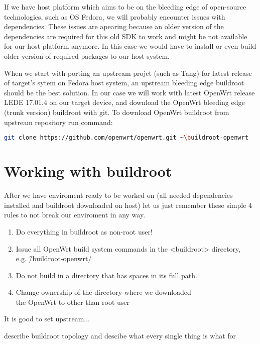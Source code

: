 If we have host platform which aims to be on the bleeding edge of open-source technologies, such as OS Fedora, we will probably encounter issues with dependencies.
These issues are apearing because an older version of the dependencies are required for this old SDK to work and might be not available for our host platform anymore.
In this case we would have to install or even build older version of required packages to our host system.

When we start with porting an upstream projet (such as Tang) for latest release of target's sytem on Fedora host system, an upstream bleeding edge buildroot should be the best solution.
In our case we will work with latest OpenWrt release LEDE 17.01.4 on our target device, and download the OpenWrt bleeding edge (trunk version) buildroot with git.
To download OpenWrt buildroot from upstream repository run command:
\begin{lstlisting}[language=bash,basicstyle=\ttfamily\footnotesize,label=get-trunk,caption=Cloning upstream OpenWrt buildroot]
    git clone https://github.com/openwrt/openwrt.git ~\buildroot-openwrt
\end{lstlisting}

\section{Working with buildroot} \label{working-with-buildroot}

After we have enviroment ready to be worked on (all needed dependencies installed and buildroot downloaded on host) let us just remember these simple 4 rules to not break our enviroment in any way.

\begin{enumerate}
    \item Do everything in buildroot as non-root user!
    \item Issue all OpenWrt build system commands in the <buildroot> directory, \\e.g. \~/buildroot-openwrt/ %
    \item Do not build in a directory that has spaces in its full path.
    \item Change ownership of the directory where we downloaded \\the OpenWrt to other than root user
\end{enumerate}

It is good to set upstream...


describe buildroot topology and descibe what every single thing is what for

